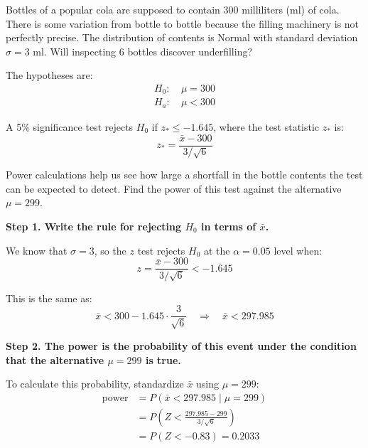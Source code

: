 \begin{example}


Bottles of a popular cola are supposed to contain 300 milliliters (ml) of cola. There is some variation from bottle to bottle because the filling machinery is not perfectly precise. The distribution of contents is Normal with standard deviation $\sigma = 3$ ml. Will inspecting 6 bottles discover underfilling?

The hypotheses are:
\begin{align*}
H_0\!:&\ \mu = 300 \\
H_a\!:&\ \mu < 300
\end{align*}

A 5\% significance test rejects $H_0$ if $z_* \leq -1.645$, where the test statistic $z_*$ is:
\[
z_* = \frac{\bar{x} - 300}{3 / \sqrt{6}}
\]

Power calculations help us see how large a shortfall in the bottle contents the test can be expected to detect. Find the power of this test against the alternative $\mu = 299$.

\vspace{1em}
\textbf{Step 1. Write the rule for rejecting $H_0$ in terms of $\bar{x}$.}

We know that $\sigma = 3$, so the $z$ test rejects $H_0$ at the $\alpha = 0.05$ level when:
\[
z = \frac{\bar{x} - 300}{3 / \sqrt{6}} < -1.645
\]

This is the same as:
\[
\bar{x} < 300 - 1.645 \cdot \frac{3}{\sqrt{6}} \quad \Rightarrow \quad \bar{x} < 297.985
\]

\vspace{1em}
\textbf{Step 2. The power is the probability of this event under the condition that the alternative $\mu = 299$ is true.}

To calculate this probability, standardize $\bar{x}$ using $\mu = 299$:
\[
\begin{aligned}
\text{power} &= P(\bar{x} < 297.985 \mid \mu = 299) \\
&= P\left( Z < \frac{297.985 - 299}{3 / \sqrt{6}} \right) \\
&= P(Z < -0.83) = 0.2033
\end{aligned}
\]

\end{example}
